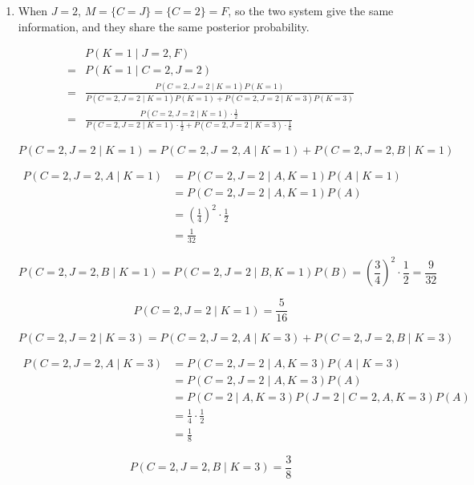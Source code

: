 \documentclass[11pt,a4paper]{article}
\begin{document}
\begin{enumerate}
    \item[(a)]

    When $J=2$, $M = \{C=J\} = \{C=2\} = F$, so the two system give the same information, and they share the same posterior probability.

    $$
    \begin{aligned}
    &P(K=1 \mid J=2, F) \\
    =& P(K=1 \mid C=2, J=2) \\
    =& \frac{P(C=2, J=2 \mid K=1) P(K=1)}{P(C=2, J=2 \mid K=1) P(K=1) + P(C=2, J=2 \mid K=3) P(K=3)} \\
    =& \frac{P(C=2, J=2 \mid K=1) \cdot \frac{1}{2}}{P(C=2, J=2 \mid K=1) \cdot \frac{1}{2} + P(C=2, J=2 \mid K=3) \cdot \frac{1}{6}}
    \end{aligned}
    $$

    $$
    P(C=2, J=2 \mid K=1) = P(C=2, J=2, A \mid K=1) + P(C=2, J=2, B \mid K=1)
    $$

    $$
    \begin{aligned}
    P(C=2, J=2, A \mid K=1)
    &= P(C=2, J=2 \mid A, K=1) P(A \mid K=1) \\
    &= P(C=2, J=2 \mid A, K=1) P(A) \\
    &= \left(\frac{1}{4}\right)^2 \cdot \frac{1}{2} \\
    &= \frac{1}{32}
    \end{aligned}
    $$

    $$
    P(C=2, J=2, B \mid K=1)
    = P(C=2, J=2 \mid B, K=1) P(B)
    = \left(\frac{3}{4}\right)^2 \cdot \frac{1}{2}
    = \frac{9}{32}
    $$

    $$
    P(C=2, J=2 \mid K=1) = \frac{5}{16}
    $$

    $$
    P(C=2, J=2 \mid K=3) = P(C=2, J=2, A \mid K=3) + P(C=2, J=2, B \mid K=3)
    $$

    $$
    \begin{aligned}
    P(C=2, J=2, A \mid K=3)
    &= P(C=2, J=2 \mid A, K=3) P(A \mid K=3) \\
    &= P(C=2, J=2 \mid A, K=3) P(A) \\
    &= P(C=2 \mid A, K=3) P(J=2 \mid C=2, A, K=3) P(A) \\
    &= \frac{1}{4} \cdot \frac{1}{2} \\
    &= \frac{1}{8}
    \end{aligned}
    $$

    $$
    P(C=2, J=2, B \mid K=3) = \frac{3}{8}
    $$


\end{enumerate}
\end{document}
